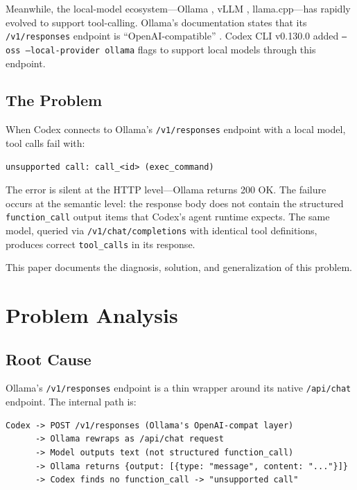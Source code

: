 \documentclass[11pt,a4paper]{article}
\begin{document}
Meanwhile, the local-model ecosystem---Ollama \cite{ollama}, vLLM
\cite{vllm}, llama.cpp---has rapidly evolved to support tool-calling.
Ollama's documentation states that its \texttt{/v1/responses} endpoint is
``OpenAI-compatible'' \cite{ollama_compat}. Codex CLI v0.130.0 added
\texttt{--oss --local-provider ollama} flags to support local models through
this endpoint.

\subsection{The Problem}

When Codex connects to Ollama's \texttt{/v1/responses} endpoint with a
local model, tool calls fail with:

\begin{lstlisting}
unsupported call: call_<id> (exec_command)
\end{lstlisting}

The error is silent at the HTTP level---Ollama returns 200 OK. The failure
occurs at the semantic level: the response body does not contain the
structured \texttt{function\_call} output items that Codex's agent runtime
expects. The same model, queried via \texttt{/v1/chat/completions} with
identical tool definitions, produces correct \texttt{tool\_calls} in its
response.

This paper documents the diagnosis, solution, and generalization of this
problem.

\section{Problem Analysis}

\subsection{Root Cause}

Ollama's \texttt{/v1/responses} endpoint is a thin wrapper around its native
\texttt{/api/chat} endpoint. The internal path is:

\begin{lstlisting}
Codex -> POST /v1/responses (Ollama's OpenAI-compat layer)
      -> Ollama rewraps as /api/chat request
      -> Model outputs text (not structured function_call)
      -> Ollama returns {output: [{type: "message", content: "..."}]}
      -> Codex finds no function_call -> "unsupported call"
\end{lstlisting}
\end{document}
